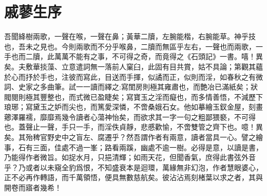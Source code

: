 \chapter*{戚蓼生序}

\begin{qute2sp}

    \begin{parag}
        \large
        吾聞絳樹兩歌，一聲在喉，一聲在鼻；黃華二牘，左腕能楷，右腕能草。神乎技也，吾未之見也。今則兩歌而不分乎喉鼻，二牘而無區乎左右，一聲也而兩歌，一手也而二牘，此萬萬不能有之事，不可得之奇，而竟得之《石頭記》一書。嘻！異矣。夫敷華掞藻、立意遣詞無一落前人窠臼，此固有目共賞，姑不具論；第觀其蘊於心而抒於手也，注彼而寫此，目送而手揮，似譎而正，似則而淫，如春秋之有微詞、史家之多曲筆。試一一讀而繹之:寫閨房則極其雍肅也，而艶冶已滿紙矣；狀閥閱則極其豐整也，而式微已盈睫矣；寫寶玉之淫而癡也，而多情善悟，不減歷下琅琊；寫黛玉之妒而尖也，而篤愛深憐，不啻桑娥石女。他如摹繪玉釵金屋，刻畫薌澤羅襦，靡靡焉幾令讀者心蕩神怡矣，而欲求其一字一句之粗鄙猥褻，不可得也。蓋聲止一聲，手只一手，而淫佚貞靜，悲慼歡愉，不啻雙管之齊下也。噫！異矣。其殆稗官野史中之盲左、腐遷乎？然吾謂作者有兩意，讀者當具一心。譬之繪事，石有三面，佳處不過一峯；路看兩蹊，幽處不逾一樹。必得是意，以讀是書，乃能得作者微旨。如捉水月，只挹清輝；如雨天花，但聞香氣，庶得此書弦外音乎？乃或者以未窺全豹爲恨，不知盛衰本是迴環，萬緣無非幻泡，作者慧眼婆心，正不必再作轉語，而千萬領悟，便具無數慈航矣。彼沾沾焉刻楮葉以求之者，其與開卷而寤者幾希！
    \end{parag}

\end{qute2sp}


